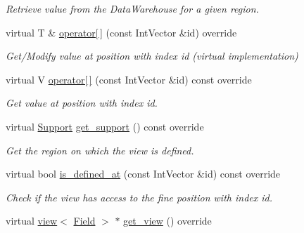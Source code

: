 \begin{DoxyCompactItemize}
\begin{DoxyCompactList}\small\item\em Retrieve value from the Data\+Warehouse for a given region. \end{DoxyCompactList}\item 
virtual T \& \hyperlink{classUintah_1_1PhaseField_1_1detail_1_1bc__fd_3_01ScalarField_3_01T_01_4_00_01STN_00_01VAR_00_01f836207db876ecd28bf65f631f79030f_a5f6be00fffcaecf7f41bde2970e21f3d}{operator\mbox{[}$\,$\mbox{]}} (const Int\+Vector \&id) override
\begin{DoxyCompactList}\small\item\em Get/\+Modify value at position with index id (virtual implementation) \end{DoxyCompactList}\item 
virtual V \hyperlink{classUintah_1_1PhaseField_1_1detail_1_1bc__fd_3_01ScalarField_3_01T_01_4_00_01STN_00_01VAR_00_01f836207db876ecd28bf65f631f79030f_a9cc3eef91571aaa6a1469f7ff3716e58}{operator\mbox{[}$\,$\mbox{]}} (const Int\+Vector \&id) const override
\begin{DoxyCompactList}\small\item\em Get value at position with index id. \end{DoxyCompactList}\item 
virtual \hyperlink{classUintah_1_1PhaseField_1_1Support}{Support} \hyperlink{classUintah_1_1PhaseField_1_1detail_1_1bc__fd_3_01ScalarField_3_01T_01_4_00_01STN_00_01VAR_00_01f836207db876ecd28bf65f631f79030f_afc1510ada00f1164ab696046f674d4ff}{get\+\_\+support} () const override
\begin{DoxyCompactList}\small\item\em Get the region on which the view is defined. \end{DoxyCompactList}\item 
virtual bool \hyperlink{classUintah_1_1PhaseField_1_1detail_1_1bc__fd_3_01ScalarField_3_01T_01_4_00_01STN_00_01VAR_00_01f836207db876ecd28bf65f631f79030f_a5712015d95670c28fd60dbd764c8d7b1}{is\+\_\+defined\+\_\+at} (const Int\+Vector \&id) const override
\begin{DoxyCompactList}\small\item\em Check if the view has access to the fine position with index id. \end{DoxyCompactList}\item 
virtual \hyperlink{classUintah_1_1PhaseField_1_1detail_1_1view}{view}$<$ \hyperlink{structUintah_1_1PhaseField_1_1ScalarField}{Field} $>$ $\ast$ \hyperlink{classUintah_1_1PhaseField_1_1detail_1_1bc__fd_3_01ScalarField_3_01T_01_4_00_01STN_00_01VAR_00_01f836207db876ecd28bf65f631f79030f_abc3b93271050f310bc7f6095ccb19d08}{get\+\_\+view} () override

\end{DoxyCompactItemize}
